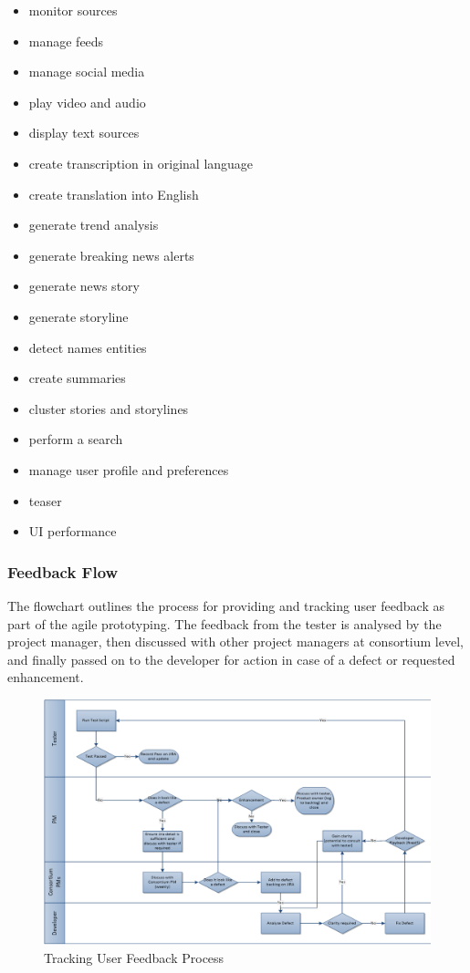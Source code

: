 \begin{itemize}
\item monitor sources
\item manage feeds
\item manage social media
\item play video and audio
\item display text sources
\item create transcription in original language
\item create translation into English
\item generate trend analysis
\item generate breaking news alerts
\item generate news story
\item generate storyline
\item detect names entities
\item create summaries
\item cluster stories and storylines
\item perform a search
\item manage user profile and preferences
\item teaser
\item UI performance
\end{itemize}

\subsubsection{Feedback Flow}
The flowchart  outlines the process for providing and tracking user feedback as part of the agile prototyping. The feedback from the tester is analysed by the project manager, then discussed with other project managers at consortium level, and finally passed on to the developer for action in case of a defect or requested enhancement. 



\begin{figure}[ht]
    \centering
    \includegraphics[width=1\textwidth,angle=270]{./images/test_script_JIRA.png}
    \caption{Tracking User Feedback Process}
    \label{fig:tracking_user_feedback}
\end{figure}



